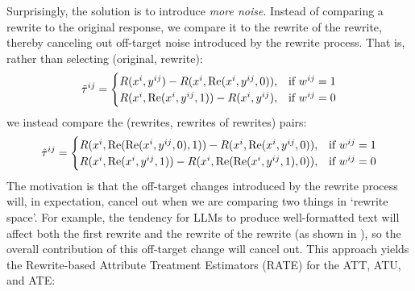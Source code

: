\documentclass{article}
\begin{document}
Surprisingly, the solution is to introduce \emph{more noise}. Instead of comparing a rewrite to the original response, we compare it to the rewrite of the rewrite, thereby canceling out off-target noise introduced by the rewrite process. That is, rather than selecting (original, rewrite):
\[
\tilde{\tau}^{ij} = 
\begingroup
\setlength\arraycolsep{1pt}
\renewcommand{\arraystretch}{0.9}
\begin{cases}
  R(x^i, y^{ij}) - R(x^i, \text{Re}(x^i, y^{ij}, 0)), & \text{if } w^{ij} = 1 \\
  R(x^i, \text{Re}(x^i, y^{ij}, 1)) - R(x^i, y^{ij}), & \text{if } w^{ij} = 0
\end{cases}
\endgroup
\]
we instead compare the (rewrites, rewrites of rewrites) pairs:
\[
\hat{\tau}^{ij} = 
\begingroup
\setlength\arraycolsep{1pt}
\renewcommand{\arraystretch}{0.9}
\begin{cases}
  R(x^i, \text{Re}(\text{Re}(x^i, y^{ij}, 0), 1)) - R(x^i, \text{Re}(x^i, y^{ij}, 0)), & \text{if } w^{ij} = 1 \\
  R(x^i, \text{Re}(x^i, y^{ij}, 1)) - R(x^i, \text{Re}(\text{Re}(x^i, y^{ij}, 1), 0)), & \text{if } w^{ij} = 0
\end{cases}
\endgroup
\]
The motivation is that the off-target changes introduced by the rewrite process will, in expectation, cancel out when we are comparing two things in `rewrite space'. For example, the tendency for LLMs to produce well-formatted text will affect both the first rewrite and the rewrite of the rewrite (as shown in ), so the overall contribution of this off-target change will cancel out. This approach yields the Rewrite-based Attribute Treatment Estimators (RATE) for the ATT, ATU, and ATE:
\end{document}

